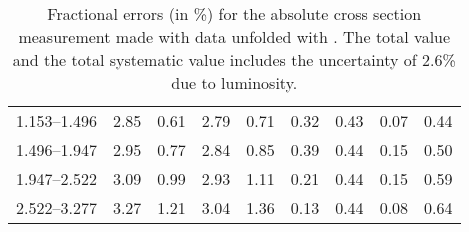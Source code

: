 \begin{table}
\begin{center}
\begin{tabular}{@{}l l l l l l l l l@{}}
            1.153--1.496    &  2.85   &  0.61   &  2.79         &  0.71      &  0.32    &  0.43  &  0.07       &  0.44  \\
            1.496--1.947    &  2.95   &  0.77   &  2.84         &  0.85      &  0.39    &  0.44  &  0.15       &  0.50  \\
            1.947--2.522    &  3.09   &  0.99   &  2.93         &  1.11      &  0.21    &  0.44  &  0.15       &  0.59  \\
            2.522--3.277    &  3.27   &  1.21   &  3.04         &  1.36      &  0.13    &  0.44  &  0.08       &  0.64  \\
            \bottomrule
        \end{tabular}
    \end{center}
    \caption[
        Fractional errors for the absolute cross section measurement
        made with data unfolded with \MADGRAPH.
    ]{
        Fractional errors (in \%) for the absolute cross section measurement
        made with data unfolded with \MADGRAPH. The total value and the total
        systematic value includes the uncertainty of 2.6\% due to luminosity.
    }
    \label{tab:sys_uncert_abs}
\end{table}
